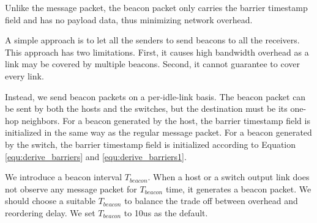 Unlike the message packet, the beacon packet only carries the barrier timestamp field and has no payload data, thus minimizing network overhead. 

A simple approach is to let all the senders to send beacons to all the receivers. This approach has two limitations. First, it causes high bandwidth overhead as a link may be covered by multiple beacons. Second, it cannot guarantee to cover every link.

Instead, we send beacon packets on a per-idle-link basis.
The beacon packet can be sent by both the hosts and the switches,
but the destination must be its one-hop neighbors. For a beacon generated by the host, the barrier timestamp field is initialized in the same way as the regular message packet. For a beacon generated by the switch, the barrier timestamp field is initialized according to Equation \ref{equ:derive_barriers} and \ref{equ:derive_barriers1}.

We introduce a beacon interval $T_{beacon}$. When a host or a switch output link does not observe any message packet for $T_{beacon}$ time, it generates a beacon packet. We should choose a suitable $T_{beacon}$ to balance the trade off between overhead and reordering delay. We set $T_{beacon}$ to 10us as the default.






